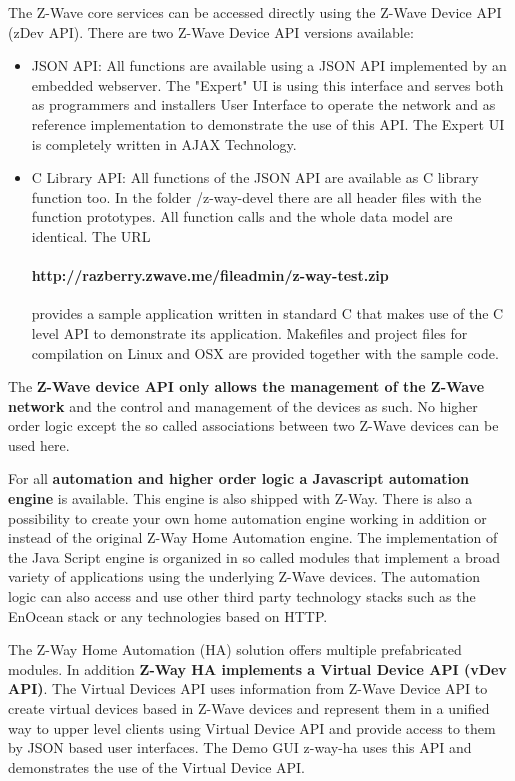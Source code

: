 The Z-Wave core services can be accessed directly using the Z-Wave Device API (zDev API). There are two
Z-Wave Device API versions available:
\begin{itemize}
\item JSON API: All functions are available using a JSON API implemented by an 
embedded webserver. The "Expert" UI is using this interface and serves both as programmers 
and installers User Interface to operate the network and as reference implementation to demonstrate the use of this 
API. The Expert UI is completely written in AJAX Technology.
\item C Library API: All functions of the JSON API are available as C library 
function too. In the folder /z-way-devel there are all header files with the function 
prototypes. All function calls and the whole data model are identical. The URL

\paragraph{http://razberry.zwave.me/fileadmin/z-way-test.zip}

provides a sample application written in standard C that makes use of the C level API to 
demonstrate its application. Makefiles and project files for compilation on Linux and 
OSX are provided together with the sample code.


\end{itemize}

The \textbf{Z-Wave device API only allows the management of the Z-Wave network} and the control
and management of the devices as such. No higher order logic except the so called associations
between two Z-Wave devices can be used here.

For all \textbf{automation and higher order logic a Javascript automation engine} is available.
This engine is also shipped with Z-Way. There is also a possibility to create your own home automation engine
working in addition or instead  of the original Z-Way Home Automation engine. 
The implementation of the Java Script engine is organized in so called modules that implement 
a broad variety of applications using the underlying Z-Wave devices. The automation logic 
can also access and use other third party technology stacks such as the EnOcean stack
or any technologies based on HTTP.

The Z-Way Home Automation (HA) solution offers multiple prefabricated modules.
In addition \textbf{Z-Way HA implements
a Virtual Device API (vDev API)}. The Virtual Devices API uses information
from Z-Wave Device API to create virtual devices based in Z-Wave devices and
represent them in a unified way to upper level clients using Virtual Device API
and provide access to them by JSON based user interfaces.
The Demo GUI z-way-ha uses this API and demonstrates the use of the Virtual Device API.


